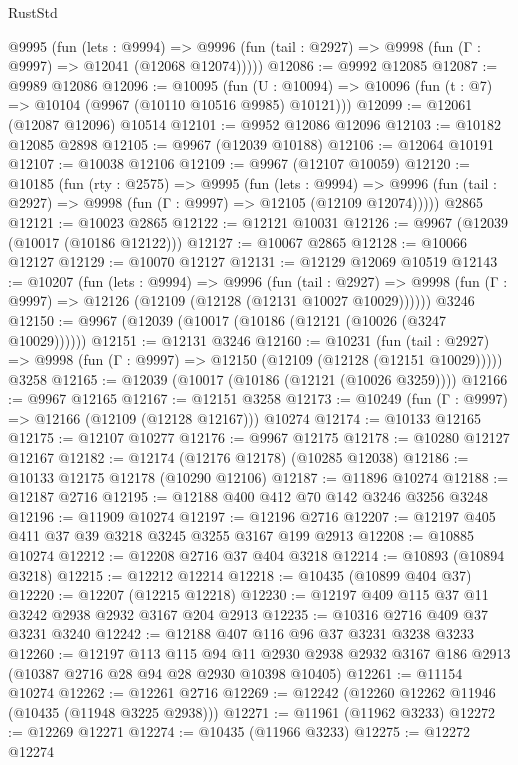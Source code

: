 \begin{lexlean}{RustStd}
\begin{coremodule}
{\begin{coremodule}
{{{{{{{{{{{{{{{{{{{{{{{{{{{{{{{{{{{{{{{{{{{{{{{{{{{{{{{{{{{{{{{{{{{{{{{{{{{{{{    @9995
      (fun (lets : @9994) =>
      @9996 (fun (tail : @2927) => @9998 (fun (Γ : @9997) => @12041 (@12068 @12074)))))
@12086 := @9992 @12085
@12087 := @9989 @12086
@12096 := @10095
    (fun (U : @10094) => @10096 (fun (t : @7) => @10104 (@9967 (@10110 @10516 @9985) @10121)))
@12099 := @12061 (@12087 @12096) @10514
@12101 := @9952 @12086 @12096
@12103 := @10182 @12085 @2898
@12105 := @9967 (@12039 @10188)
@12106 := @12064 @10191
@12107 := @10038 @12106
@12109 := @9967 (@12107 @10059)
@12120 := @10185
    (fun (rty : @2575) =>
    @9995
      (fun (lets : @9994) =>
      @9996 (fun (tail : @2927) => @9998 (fun (Γ : @9997) => @12105 (@12109 @12074)))))
    @2865
@12121 := @10023 @2865
@12122 := @12121 @10031
@12126 := @9967 (@12039 (@10017 (@10186 @12122)))
@12127 := @10067 @2865
@12128 := @10066 @12127
@12129 := @10070 @12127
@12131 := @12129 @12069 @10519
@12143 := @10207
    (fun (lets : @9994) =>
    @9996
      (fun (tail : @2927) =>
      @9998 (fun (Γ : @9997) => @12126 (@12109 (@12128 (@12131 @10027 @10029))))))
    @3246
@12150 := @9967 (@12039 (@10017 (@10186 (@12121 (@10026 (@3247 @10029))))))
@12151 := @12131 @3246
@12160 := @10231
    (fun (tail : @2927) => @9998 (fun (Γ : @9997) => @12150 (@12109 (@12128 (@12151 @10029)))))
    @3258
@12165 := @12039 (@10017 (@10186 (@12121 (@10026 @3259))))
@12166 := @9967 @12165
@12167 := @12151 @3258
@12173 := @10249 (fun (Γ : @9997) => @12166 (@12109 (@12128 @12167))) @10274
@12174 := @10133 @12165
@12175 := @12107 @10277
@12176 := @9967 @12175
@12178 := @10280 @12127 @12167
@12182 := @12174 (@12176 @12178) (@10285 @12038)
@12186 := @10133 @12175 @12178 (@10290 @12106)
@12187 := @11896 @10274
@12188 := @12187 @2716
@12195 := @12188 @400 @412 @70 @142 @3246 @3256 @3248
@12196 := @11909 @10274
@12197 := @12196 @2716
@12207 := @12197 @405 @411 @37 @39 @3218 @3245 @3255 @3167 @199 @2913
@12208 := @10885 @10274
@12212 := @12208 @2716 @37 @404 @3218
@12214 := @10893 (@10894 @3218)
@12215 := @12212 @12214
@12218 := @10435 (@10899 @404 @37)
@12220 := @12207 (@12215 @12218)
@12230 := @12197 @409 @115 @37 @11 @3242 @2938 @2932 @3167 @204 @2913
@12235 := @10316 @2716 @409 @37 @3231 @3240
@12242 := @12188 @407 @116 @96 @37 @3231 @3238 @3233
@12260 := @12197
    @113
    @115
    @94
    @11
    @2930
    @2938
    @2932
    @3167
    @186
    @2913
    (@10387 @2716 @28 @94 @28 @2930 @10398 @10405)
@12261 := @11154 @10274
@12262 := @12261 @2716
@12269 := @12242 (@12260 @12262 @11946 (@10435 (@11948 @3225 @2938)))
@12271 := @11961 (@11962 @3233)
@12272 := @12269 @12271
@12274 := @10435 (@11966 @3233)
@12275 := @12272 @12274
}}}}}}}}}}}}}}}}}}}}}}}}}}}}}}}}}}}}}}}}}}}}}}}}}}}}}}}}}}}}}}}}}}}}}}}}}}}}}}
\end{coremodule}}
\end{coremodule}
\end{lexlean}
